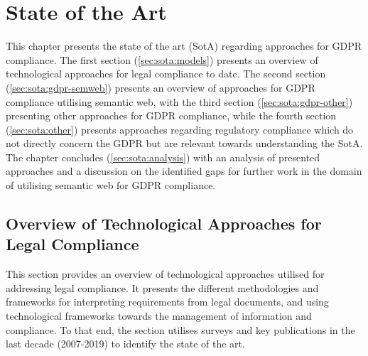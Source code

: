 \chapter{State of the Art}\label{chapter:sota}
This chapter presents the state of the art (SotA) regarding approaches for GDPR compliance.
The first section (\autoref{sec:sota:models}) presents an overview of technological approaches for legal compliance to date.
The second section (\autoref{sec:sota:gdpr-semweb}) presents an overview of approaches for GDPR compliance utilising semantic web, with the third section (\autoref{sec:sota:gdpr-other}) presenting other approaches for GDPR compliance,
while the fourth section (\autoref{sec:sota:other}) presents approaches regarding regulatory compliance which do not directly concern the GDPR but are relevant towards understanding the SotA.
The chapter concludes (\autoref{sec:sota:analysis}) with an analysis of presented approaches and a discussion on the identified gaps for further work in the domain of utilising semantic web for GDPR compliance.

\section{Overview of Technological Approaches for Legal Compliance}\label{sec:sota:models}
This section provides an overview of technological approaches utilised for addressing legal compliance. It presents the different methodologies and frameworks for interpreting requirements from legal documents, and using technological frameworks towards the management of information and compliance.
To that end, the section utilises surveys and key publications in the last decade (2007-2019) to identify the state of the art.

